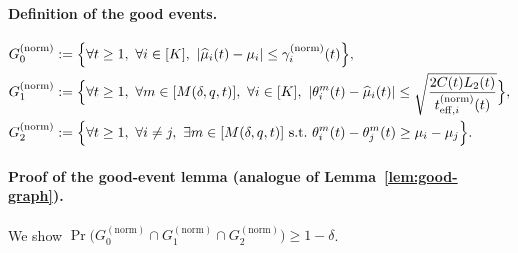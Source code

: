 \documentclass{article}
\begin{document}
\paragraph{Definition of the good events.}
\begin{align*}
G_0^{(\mathrm{norm})}
&:=
\Bigl\{
\forall t\ge 1,\ \forall i\in[K],\
|\widehat\mu_i(t)-\mu_i|\le \gamma_i^{(\mathrm{norm})}(t)
\Bigr\},\\
G_1^{(\mathrm{norm})}
&:=
\Bigl\{
\forall t\ge 1,\ \forall m\in[M(\delta,q,t)],\ \forall i\in[K],\
|\theta_i^m(t)-\widehat\mu_i(t)|
\le
\sqrt{\frac{2C(t)L_2(t)}{t_{\mathrm{eff},i}^{(\mathrm{norm})}(t)}}
\Bigr\},\\
G_2^{(\mathrm{norm})}
&:=
\Bigl\{
\forall t\ge 1,\ \forall i\neq j,\ \exists m\in[M(\delta,q,t)]
\text{ s.t.\ }
\theta_i^m(t)-\theta_j^m(t)\ge \mu_i-\mu_j
\Bigr\}.
\end{align*}

\paragraph{Proof of the good-event lemma (analogue of Lemma~\ref{lem:good-graph}).}
We show $\Pr\!\bigl(G_0^{(\mathrm{norm})}\cap G_1^{(\mathrm{norm})}\cap G_2^{(\mathrm{norm})}\bigr)\ge 1-\delta$.
\end{document}
